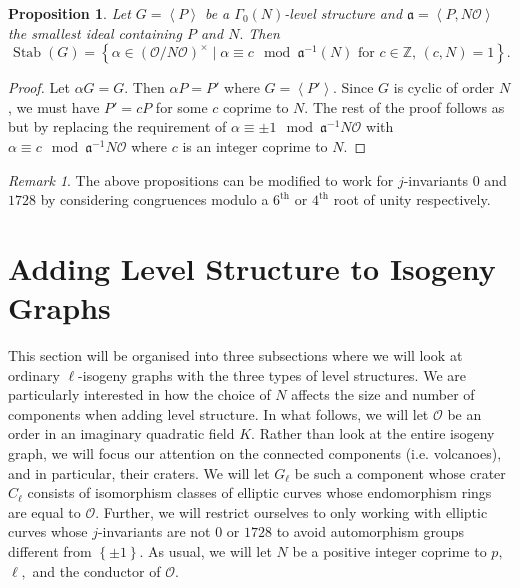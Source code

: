 \documentclass[11pt,a4paper]{amsart}
\theoremstyle{plain}
\newtheorem{prop}[thm]{Proposition}
\theoremstyle{definition}
\theoremstyle{remark}
\newtheorem{rmk}[thm]{Remark}
\DeclareMathOperator{\Stab}{Stab}
\begin{document}
\begin{prop}\label{prop:stab-gamma-0}
  Let $G = \left\langle P \right\rangle$ be a $\Gamma_0(N)$-level structure and $\mathfrak{a} = \left\langle P, N \mathcal{O} \right\rangle$ the smallest ideal containing $P$ and $N.$ Then
    \[
      \Stab(G) = \left\{ \alpha \in (\mathcal{O}/N \mathcal{O})^{\times} \mid \alpha \equiv c \mod \mathfrak{a}^{-1}(N) \text{ for } c \in \mathbb{Z},\, (c, N) = 1\right\}.
    \]
\end{prop}
\begin{proof}
  Let $\alpha G = G.$ Then $\alpha P = P'$ where $G = \left\langle P' \right\rangle.$ Since $G$ is cyclic of order $N$, we must have $P' = c P$ for some $c$ coprime to $N.$ The rest of the proof follows as  but by replacing the requirement of $\alpha \equiv \pm 1 \mod \mathfrak{a}^{-1}N \mathcal{O}$ with $\alpha \equiv c \mod \mathfrak{a}^{-1}N \mathcal{O}$ where $c$ is an integer coprime to $N.$
\end{proof}
\begin{rmk}
  The above propositions can be modified to work for $j$-invariants $0$ and $1728$ by considering congruences modulo a $6^{\text{th}}$ or $4^{\text{th}}$ root of unity respectively.
\end{rmk}
\section{Adding Level Structure to Isogeny Graphs}\label{sec:level-structures}
This section will be organised into three subsections where we will look at ordinary $\ell$-isogeny graphs with the three types of level structures. We are particularly interested in how the choice of $N$ affects the size and number of components when adding level structure.  In what follows, we will let $\mathcal{O}$ be an order in an imaginary quadratic field $K.$ Rather than look at the entire isogeny graph, we will focus our attention on the connected components (i.e. volcanoes), and in particular, their craters.  We will let $G_{\ell}$ be such a component whose crater $C_{\ell}$ consists of isomorphism classes of elliptic curves whose endomorphism rings are equal to $\mathcal{O}.$ Further, we will restrict ourselves to only working with elliptic curves whose $j$-invariants are not $0$ or $1728$ to avoid automorphism groups different from $\left\{ \pm 1 \right\}.$ As usual, we will let $N$ be a positive integer coprime to $p,$ $\ell,$ and the conductor of $\mathcal{O}.$
\end{document}
